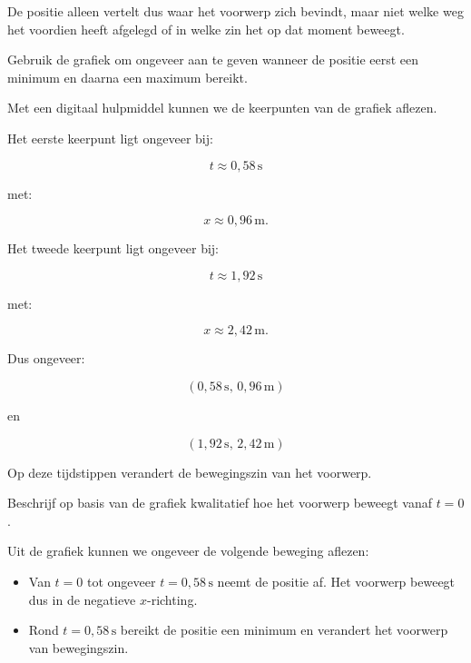 \documentclass{ximera}
\begin{document}
\begin{oefening}{\oefU\ESS}
\begin{question}
\begin{oplossing}
  De positie alleen vertelt dus waar het voorwerp zich bevindt, maar niet welke
  weg het voordien heeft afgelegd of in welke zin het op dat moment beweegt.
  \end{oplossing}
  \end{question}
  
  
  \begin{question}
  Gebruik de grafiek om ongeveer aan te geven wanneer de positie eerst een
  minimum en daarna een maximum bereikt.
  
  \begin{oplossing}
  Met een digitaal hulpmiddel kunnen we de keerpunten van de grafiek aflezen.
  
  Het eerste keerpunt ligt ongeveer bij:
  
  \[
  t\approx0{,}58\,\mathrm{s}
  \]
  
  met:
  
  \[
  x\approx0{,}96\,\mathrm{m}.
  \]
  
  Het tweede keerpunt ligt ongeveer bij:
  
  \[
  t\approx1{,}92\,\mathrm{s}
  \]
  
  met:
  
  \[
  x\approx2{,}42\,\mathrm{m}.
  \]
  
  Dus ongeveer:
  
  \[
  \boxed{
  (0{,}58\,\mathrm{s},\,0{,}96\,\mathrm{m})
  }
  \]
  
  en
  
  \[
  \boxed{
  (1{,}92\,\mathrm{s},\,2{,}42\,\mathrm{m})
  }
  \]
  
  Op deze tijdstippen verandert de bewegingszin van het voorwerp.
  \end{oplossing}
  \end{question}
  
  
  \begin{question}
  Beschrijf op basis van de grafiek kwalitatief hoe het voorwerp beweegt vanaf
  $t=0$.
  
  \begin{oplossing}
  Uit de grafiek kunnen we ongeveer de volgende beweging aflezen:
  
  \begin{itemize}
      \item Van $t=0$ tot ongeveer $t=0{,}58\,\mathrm{s}$ neemt de positie af.
      Het voorwerp beweegt dus in de negatieve $x$-richting.
  
      \item Rond $t=0{,}58\,\mathrm{s}$ bereikt de positie een minimum en
      verandert het voorwerp van bewegingszin.
  

\end{itemize}
\end{oplossing}
\end{question}
\end{oefening}
\end{document}
